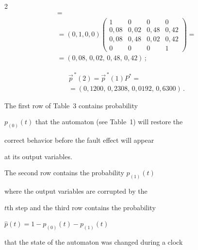 \begin{multicols}{2}
\begin{multline*}
={}\\

{}=

(0,1,0,0)

\begin{pmatrix}

1      &   0    &   0    &   0       \\

0{,}08 & 0{,}02 & 0{,}48 &  0{,}42   \\

0{,}08 & 0{,}48 & 0{,}02 &  0{,}42   \\

0      &   0    & 0      &   1

\end{pmatrix}={}\\

{}= (0{,}08,\,0{,}02,\,0{,}48,\,0{,}42)\,;

\end{multline*}



\vspace*{-6pt}



\noindent

\begin{multline*}

\vec p^{\,*}(2)

=

\vec p^{\,*}(1) P^*

={}\\

{}=

(0{,}1200,\,0{,}2308,\,0{,}0192,\,0{,}6300)\,.

\end{multline*}



The  first row of Table~3 contains  probability

$p_{(0)}(t)$ that the automaton (see Table~1) will restore the

correct behavior before the fault effect will appear

at its output variables.

The second row contains the probability $p_{(1)}(t)$

where the output variables are corrupted by the

$t$th step and the third row contains the probability

$\hat p(t)=1-p_{(0)}(t)-p_{(1)}(t)$

that the state of the automaton was changed during a clock


\end{multicols}
